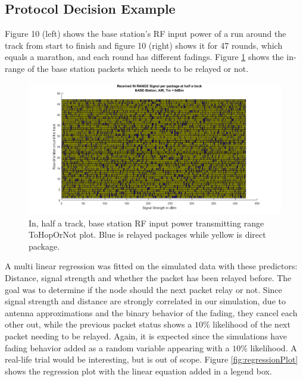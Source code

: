 \subsection{Protocol Decision Example}\label{sc:protocolDecisionExample}
Figure 10 (left) shows the base station's RF input power of a run around the track from start to finish and figure 10 (right) shows it for 47 rounds, which equals a marathon, and each round has different fadings. Figure \ref{fig:recievedSignal_inRange_halfTrack} shows the in-range of the base station packets which needs to be relayed or not.


\begin{figure}[H]
	\centering
	\includegraphics[width=\linewidth]{theory/protocolDecisionExample/fig/recievedSignal_inRange_halfTrack.png}
	\caption{In, half a track, base station RF input power transmitting range ToHopOrNot plot. Blue is relayed packages while yellow is direct package.}
	\label{fig:recievedSignal_inRange_halfTrack}
\end{figure}

\noindent A multi linear regression was fitted on the simulated data with these predictors: Distance, signal strength and whether the packet has been relayed before. The goal was to determine if the node should the next packet relay or not. Since signal strength and distance are strongly correlated in our simulation, due to antenna approximations and the binary behavior of the fading, they cancel each other out, while the previous packet status shows a $10\%$ likelihood of the next packet needing to be relayed. Again, it is expected since the simulations have fading behavior added as a random variable appearing with a $10\%$ likelihood. A real-life trial would be interesting, but is out of scope. Figure \ref{fig:regressionPlot} shows the regression plot with the linear equation added in a legend box.

